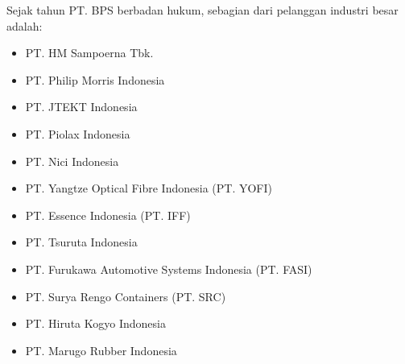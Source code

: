 Sejak tahun PT. BPS berbadan hukum, sebagian dari pelanggan industri besar adalah:
\begin{multicols}{2}
\begin{itemize}
\item PT. HM Sampoerna Tbk.
\item PT. Philip Morris Indonesia
\item PT. JTEKT Indonesia
\item PT. Piolax Indonesia
\item PT. Nici Indonesia
\item PT. Yangtze Optical Fibre Indonesia (PT. YOFI)
\item PT. Essence Indonesia (PT. IFF)
\item PT. Tsuruta Indonesia
\item PT. Furukawa Automotive Systems Indonesia (PT. FASI)
\item PT. Surya Rengo Containers (PT. SRC)
\item PT. Hiruta Kogyo Indonesia
\item PT. Marugo Rubber Indonesia
\end{itemize}
\end{multicols}